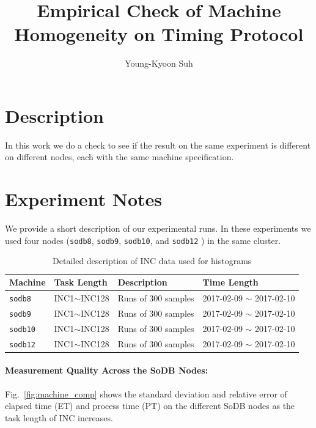 \documentclass[10pt]{article}
\begin{document}
\title{Empirical Check of Machine Homogeneity on Timing Protocol}

\author{
Young-Kyoon Suh\\
}
\maketitle

\section{Description}
In this work we do a check to see if the result on the same experiment is different 
on different nodes, each with the same machine specification.

\section{Experiment Notes}
We provide a short description of our experimental runs. 
In these experiments we used four nodes ({\tt sodb8}, {\tt sodb9}, {\tt sodb10}, and {\tt sodb12} ) 
in the same cluster. 

\begin{table}[h]
\begin{center}
\begin{tabular}{|p{2cm}|p{3cm}|p{6cm}|p{4cm}|} \hline
Machine & Task Length & Description & Time Length\\ \hline
{\tt sodb8} &  INC1$\sim$INC128 & Runs of 300 samples & 2017-02-09 $\sim$ 2017-02-10\\ \hline
{\tt sodb9} &  INC1$\sim$INC128 & Runs of 300 samples & 2017-02-09 $\sim$ 2017-02-10\\ \hline
{\tt sodb10} & INC1$\sim$INC128 & Runs of 300 samples & 2017-02-09 $\sim$ 2017-02-10\\ \hline
{\tt sodb12} & INC1$\sim$INC128 & Runs of 300 samples & 2017-02-09 $\sim$ 2017-02-10\\ \hline
\end{tabular}
\end{center}
\vspace{-.2in}
\caption{Detailed description of INC data used for histograms\label{tab:exp_notes}}
\end{table}

\paragraph{Measurement Quality Across the SoDB Nodes:} 
Fig.~\ref{fig:machine_comp} shows 
the standard deviation and relative error of 
elapsed time (ET) and process time (PT) on the different SoDB nodes 
as the task length of INC increases. 
\end{document}
